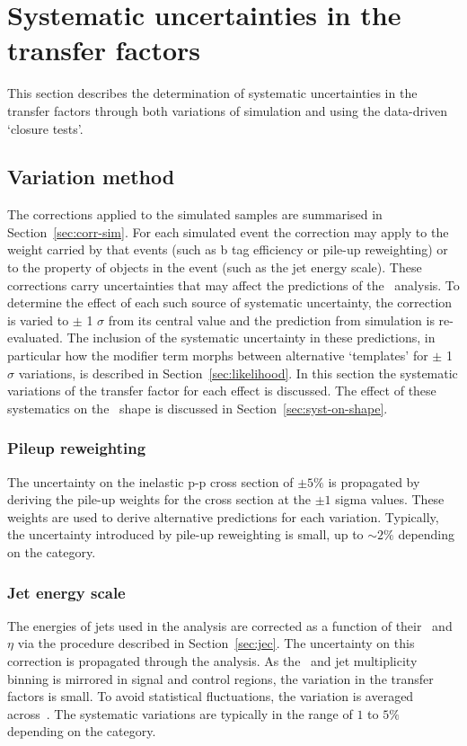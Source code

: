 \section{Systematic uncertainties in the transfer factors}
\label{sec:syst-uncs}
This section describes the determination of systematic uncertainties 
in the transfer factors through both variations of simulation
and using the data-driven `closure tests'. 

\subsection{Variation method}
\label{sec:syst-uncs-var}
The corrections applied to the simulated samples are summarised in Section~\ref{sec:corr-sim}. For each 
simulated event the correction may apply to the weight carried by that events (such as b tag efficiency
or pile-up reweighting) or to the property of objects in the event (such as the jet energy scale). 
These corrections carry uncertainties that may affect the predictions of the \alphat~analysis.
To determine the effect of each such source of systematic uncertainty, the correction is varied to $\pm$ 1 $\sigma$ from its central value and the prediction from simulation is re-evaluated. The inclusion of the systematic uncertainty 
in these predictions, in particular how the modifier term morphs between alternative `templates'  
for $\pm$ 1 $\sigma$ variations, is described in Section~\ref{sec:likelihood}. In this section the systematic variations
of the transfer factor for each effect is discussed. The effect of these systematics on 
the \mht~shape is discussed in Section~\ref{sec:syst-on-shape}.

\subsubsection{Pileup reweighting}

The uncertainty on the inelastic p-p cross section of $\pm5\%$ is propagated by deriving the pile-up
weights for the cross section at the $\pm1$ sigma values. These weights are used to derive
alternative predictions for each variation. Typically, the uncertainty 
introduced by pile-up reweighting is small, up to $\sim2\%$ depending on the category.

\subsubsection{Jet energy scale}
The energies of jets used in the analysis are corrected as a function of their \pt~and
$\eta$ via the procedure described in Section~\ref{sec:jec}. The uncertainty on
this correction is propagated through the analysis. As the \scalht~and jet multiplicity binning is 
mirrored in signal and control regions, the variation in the transfer factors is small.
To avoid statistical fluctuations, the variation is averaged across~\nb.
The systematic variations are typically in the range of $1$ to $5\%$ depending on the category.

